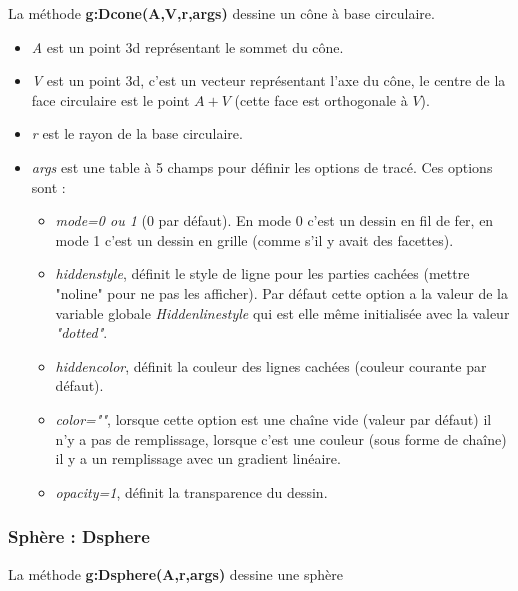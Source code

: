 \documentclass[%
10pt,%
a4paper,%
french,%
]%
{article}%
\begin{document}
La méthode \textbf{g:Dcone(A,V,r,args)} dessine un cône à base circulaire.

\begin{itemize}
    \item \emph{A} est un point 3d représentant le sommet du cône.
    \item \emph{V} est un point 3d, c'est un vecteur représentant l'axe du cône, le centre de la face circulaire est le point $A+V$ (cette face est orthogonale à $V$).
    \item \emph{r} est le rayon de la base circulaire.
    \item \emph{args} est une table à 5 champs pour définir les options de tracé. Ces options sont :
        \begin{itemize}
            \item \emph{mode=0 ou 1} (0 par défaut). En mode 0 c'est un dessin en fil de fer, en mode 1 c'est un dessin en grille (comme s'il y avait des facettes).
            \item \emph{hiddenstyle}, définit le style de ligne pour les parties cachées (mettre "noline" pour ne pas les afficher). Par défaut cette option a la valeur de la variable globale \emph{Hiddenlinestyle} qui est elle même initialisée avec la valeur \emph{"dotted"}.
            \item \emph{hiddencolor}, définit la couleur des lignes cachées (couleur courante par défaut).
            \item \emph{color=""}, lorsque cette option est une chaîne vide (valeur par défaut) il n'y a pas de remplissage,  lorsque c'est une couleur (sous forme de chaîne) il y a un remplissage avec un gradient linéaire.
            \item \emph{opacity=1}, définit la transparence du dessin.
        \end{itemize}
\end{itemize}

\subsubsection{ Sphère : Dsphere}

La méthode \textbf{g:Dsphere(A,r,args)} dessine une sphère
\end{document}
